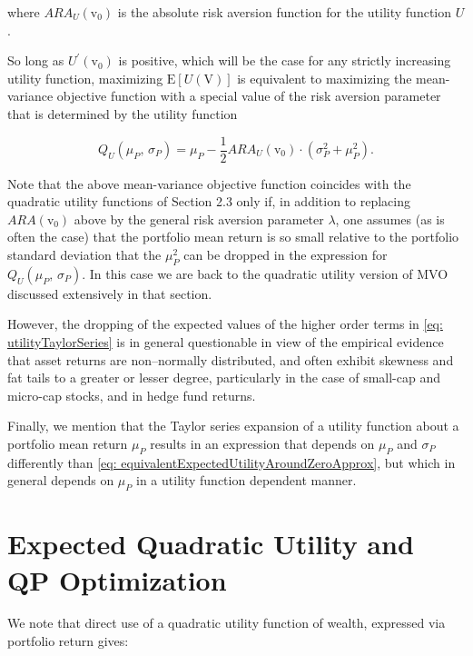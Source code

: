 \documentclass[graybox,envcountchap,sectrefs]{svmono}\usepackage[]{graphicx}\usepackage[]{xcolor}
\begin{document}
\begin{appendices}
where $ARA_{U}(\mathrm{v}_{0})$ is the absolute risk aversion function
for the utility function $U$.

So long as $U^{\prime}(\mathrm{v}_{0})$ is positive, which will be
the case for any strictly increasing utility function, maximizing
$\mathrm{E}\left[U(\mathrm{V})\right]$ is equivalent to maximizing
the mean-variance objective function with a special value of the risk
aversion parameter that is determined by the utility function

\begin{equation}
Q_{U}(\mu_{P},\,\sigma_{P})=\mu_{P}-\dfrac{1}{2}ARA_{U}(\mathrm{v}_{0})\cdot\left(\sigma_{P}^{2}+\mu_{P}^{2}\right).\label{eq: equivalentxpectedUtilityTwoTermTaylor}
\end{equation}

Note that the above mean-variance objective function coincides with
the quadratic utility functions of Section 2.3 only if, in addition
to replacing $ARA(\mathrm{v}_{0})$ above by the general risk aversion
parameter $\lambda$, one assumes (as is often the case) that the
portfolio mean return is so small relative to the portfolio standard
deviation that the $\mu_{P}^{2}$ can be dropped in the expression
for $Q_{U}(\mu_{P},\,\sigma_{P})$. In this case we are back to the
quadratic utility version of MVO discussed extensively in that section.

However, the dropping of the expected values of the higher order terms
in \eqref{eq: utilityTaylorSeries} is in general questionable in
view of the empirical evidence that asset returns are non--normally
distributed, and often exhibit skewness and fat tails to a greater
or lesser degree, particularly in the case of small-cap and micro-cap
stocks, and in hedge fund returns. 

Finally, we mention that the Taylor series expansion of a utility
function about a portfolio mean return $\mu_{P}$ results in an expression
that depends on $\mu_{P}$ and $\sigma_{P}$ differently than \eqref{eq: equivalentExpectedUtilityAroundZeroApprox},
but which in general depends on $\mu_{P}$ in a utility function dependent
manner. 

\section{Expected Quadratic Utility and QP Optimization}

We note that direct use of a quadratic utility function of wealth,
expressed via portfolio return gives:


\end{appendices}
\end{document}
